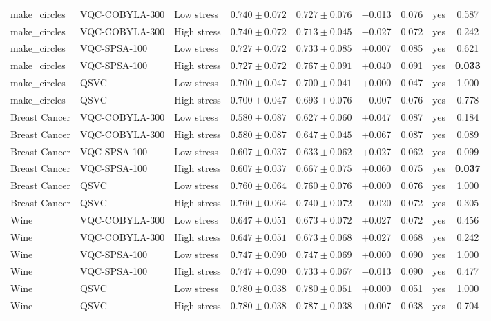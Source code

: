 \documentclass[12pt,a4paper]{article}
\begin{document}
{{\begin{longtable}{lllcccccc}
\midrule
make\_circles & VQC-COBYLA-300 & Low stress & $0.740\pm0.072$ & $0.727\pm0.076$ & $-$0.013 & 0.076 & yes & 0.587 \\
make\_circles & VQC-COBYLA-300 & High stress & $0.740\pm0.072$ & $0.713\pm0.045$ & $-$0.027 & 0.072 & yes & 0.242 \\
make\_circles & VQC-SPSA-100 & Low stress & $0.727\pm0.072$ & $0.733\pm0.085$ & +0.007 & 0.085 & yes & 0.621 \\
make\_circles & VQC-SPSA-100 & High stress & $0.727\pm0.072$ & $0.767\pm0.091$ & +0.040 & 0.091 & yes & \textbf{0.033} \\
make\_circles & QSVC & Low stress & $0.700\pm0.047$ & $0.700\pm0.041$ & +0.000 & 0.047 & yes & 1.000 \\
make\_circles & QSVC & High stress & $0.700\pm0.047$ & $0.693\pm0.076$ & $-$0.007 & 0.076 & yes & 0.778 \\
\midrule
Breast Cancer & VQC-COBYLA-300 & Low stress & $0.580\pm0.087$ & $0.627\pm0.060$ & +0.047 & 0.087 & yes & 0.184 \\
Breast Cancer & VQC-COBYLA-300 & High stress & $0.580\pm0.087$ & $0.647\pm0.045$ & +0.067 & 0.087 & yes & 0.089 \\
Breast Cancer & VQC-SPSA-100 & Low stress & $0.607\pm0.037$ & $0.633\pm0.062$ & +0.027 & 0.062 & yes & 0.099 \\
Breast Cancer & VQC-SPSA-100 & High stress & $0.607\pm0.037$ & $0.667\pm0.075$ & +0.060 & 0.075 & yes & \textbf{0.037} \\
Breast Cancer & QSVC & Low stress & $0.760\pm0.064$ & $0.760\pm0.076$ & +0.000 & 0.076 & yes & 1.000 \\
Breast Cancer & QSVC & High stress & $0.760\pm0.064$ & $0.740\pm0.072$ & $-$0.020 & 0.072 & yes & 0.305 \\
\midrule
Wine & VQC-COBYLA-300 & Low stress & $0.647\pm0.051$ & $0.673\pm0.072$ & +0.027 & 0.072 & yes & 0.456 \\
Wine & VQC-COBYLA-300 & High stress & $0.647\pm0.051$ & $0.673\pm0.068$ & +0.027 & 0.068 & yes & 0.242 \\
Wine & VQC-SPSA-100 & Low stress & $0.747\pm0.090$ & $0.747\pm0.069$ & +0.000 & 0.090 & yes & 1.000 \\
Wine & VQC-SPSA-100 & High stress & $0.747\pm0.090$ & $0.733\pm0.067$ & $-$0.013 & 0.090 & yes & 0.477 \\
Wine & QSVC & Low stress & $0.780\pm0.038$ & $0.780\pm0.051$ & +0.000 & 0.051 & yes & 1.000 \\
Wine & QSVC & High stress & $0.780\pm0.038$ & $0.787\pm0.038$ & +0.007 & 0.038 & yes & 0.704 \\
\end{longtable}
}
}
\end{document}
